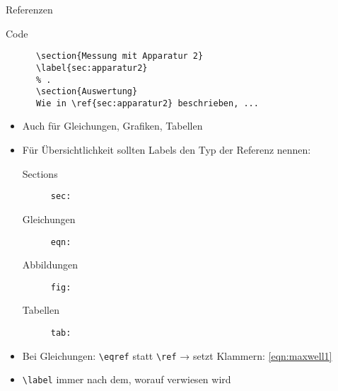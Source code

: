 \begin{frame}[fragile]{Referenzen}
  \begin{block}{Code}
    \begin{lstlisting}
      \section{Messung mit Apparatur 2}
      \label{sec:apparatur2}
      % .
      \section{Auswertung}
      Wie in \ref{sec:apparatur2} beschrieben, ...
    \end{lstlisting}
  \end{block}
  \begin{itemize}
    \item Auch für Gleichungen, Grafiken, Tabellen
    \item Für Übersichtlichkeit sollten Labels den Typ der Referenz nennen:
      \begin{description}
        \item[Sections]    \texttt{sec:}
        \item[Gleichungen] \texttt{eqn:}
        \item[Abbildungen] \texttt{fig:}
        \item[Tabellen]    \texttt{tab:}
      \end{description}
    \item Bei Gleichungen: \lstinline+\eqref+ statt \lstinline+\ref+ → setzt Klammern: \eqref{eqn:maxwell1}
    \item \lstinline+\label+ immer nach dem, worauf verwiesen wird
  \end{itemize}
\end{frame}

